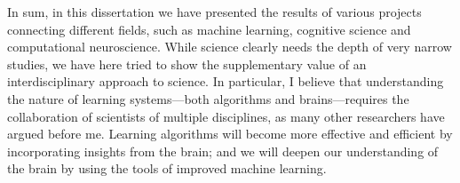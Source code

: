 {In sum, in this dissertation we have presented the results of various projects connecting different fields, such as machine learning, cognitive science and computational neuroscience. While science clearly needs the depth of very narrow studies, we have here tried to show the supplementary value of an interdisciplinary approach to science. In particular, I believe that understanding the nature of learning systems---both algorithms and brains---requires the collaboration of scientists of multiple disciplines, as many other researchers have argued before me. Learning algorithms will become more effective and efficient by incorporating insights from the brain; and we will deepen our understanding of the brain by using the tools of improved machine learning. 
}

